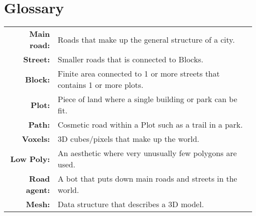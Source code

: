 \section*{Glossary}

\begin{table}[h!]
    \centering
    \begin{tabular}{rl}
        \textbf{Main road:}  & Roads that make up the general structure of a city.                       \\
        \textbf{Street:}     & Smaller roads that is connected to Blocks.                                \\
        \textbf{Block:}      & Finite area connected to 1 or more streets that contains 1 or more plots. \\
        \textbf{Plot:}       & Piece of land where a single building or park can be fit.                 \\
        \textbf{Path:}       & Cosmetic road within a Plot such as a trail in a park.                    \\
        \textbf{Voxels:}     & 3D cubes/pixels that make up the world.                                   \\
        \textbf{Low Poly:}   & An aesthetic where very unusually few polygons are used.                  \\
        \textbf{Road agent:} & A bot that puts down main roads and streets in the world.                 \\
        \textbf{Mesh:}       & Data structure that describes a 3D model.                                
    \end{tabular}
\end{table}